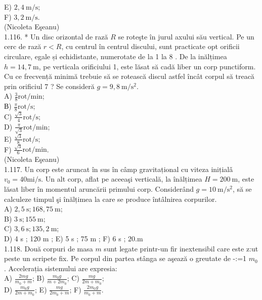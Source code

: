 \documentclass[10pt]{article}
\begin{document}
E) $2,4 \mathrm{~m} / \mathrm{s}$;\\
F) $3,2 \mathrm{~m} / \mathrm{s}$.\\
(Nicoleta Eşeanu)\\
1.116. * Un disc orizontal de rază $R$ se roteşte în jurul axului său vertical. Pe un cerc de rază $r<R$, cu centrul în centrul discului, sunt practicate opt orificii circulare, egale și echidistante, numerotate de la 1 la 8 . De la inălțimea $h=14,7 \mathrm{~m}$, pe verticala orificiului 1, este lăsat să cadă liber un corp punctiform. Cu ce frecvență minimă trebuie să se rotească discul astfel încât corpul să treacă prin orificiul 7 ? Se consideră $g=9,8 \mathrm{~m} / \mathrm{s}^{2}$.\\
A) $\frac{3}{8} \mathrm{rot} / \mathrm{min}$;\\
В) $\frac{\pi}{8} \mathrm{rot} / \mathrm{s}$;\\
C) $\frac{\sqrt{3}}{4} \mathrm{rot} / \mathrm{s}$;\\
D) $\frac{\pi}{\sqrt{3}} \mathrm{rot} / \mathrm{min}$;\\
E) $\frac{\sqrt{3}}{8} \mathrm{rot} / \mathrm{s}$;\\
F) $\frac{\sqrt{3}}{6} \mathrm{rot} / \mathrm{min}$.\\
(Nicoleta Eşeanu)\\
1.117. Un corp este aruncat în sus în câmp gravitațional cu viteza inițialǎ $v_{0}=40 \mathrm{mi} / \mathrm{s}$. Un alt corp, aflat pe aceeaşi verticală, la înălțimea $H=200 \mathrm{~m}$, este lăsat liber în momentul aruncării primului corp. Considerând $g=10 \mathrm{~m} / \mathrm{s}^{2}$, să se calculeze timpul şi înălțimea la care se produce întâlnirea corpurilor.\\
A) $2,5 \mathrm{~s} ; 168,75 \mathrm{~m}$;\\
B) $3 \mathrm{~s} ; 155 \mathrm{~m}$;\\
C) $3,6 \mathrm{~s} ; 135,2 \mathrm{~m}$;\\
D) 4 s ; 120 m ; E) 5 s ; 75 m ; F) 6 s ; $20 . \mathrm{m}$\\
1.118. Două corpuri de masa $m$ sunt legate printr-un fir inextensibil care este z:ut peste un scripete fix. Pe corpul din partea stânga se aşează o greutate de -:=1 $m_{0}$. Accelerația sistemului are expresia:\\
A) $\frac{2 m g}{m_{0}+m}$; B) $\frac{m_{0} g}{m+2 m_{0}}$; C) $\frac{m g}{2 m+m_{0}}$;\\
D) $\frac{m_{0} g}{2 m+m_{0}}$; E) $\frac{m g}{2 m_{0}+m}$; F) $\frac{2 m_{0} g}{m_{0}+m}$.\\
\end{document}
